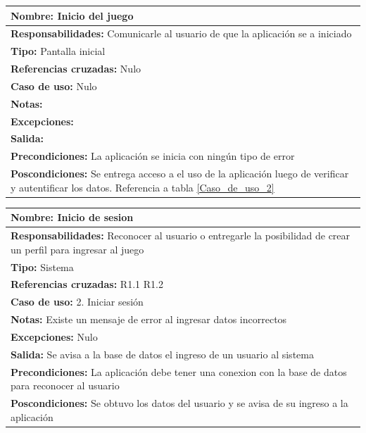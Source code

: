 \begin{table}[H]
    \begin{center}
        \begin{tabular}{| m{15cm} |}       
        	\hline 
        	\textbf{Nombre:} Inicio del juego \\
        	\hline
        	\textbf{Responsabilidades:} Comunicarle al usuario de que la aplicación se a iniciado\\
        	\hline
        	\textbf{Tipo:} Pantalla inicial \\
        	\hline
        	\textbf{Referencias cruzadas:} Nulo\\
        	\hline
        	\textbf{Caso de uso:} Nulo\\
        	\hline
        	\textbf{Notas:} \\
        	\hline
        	\textbf{Excepciones:} \\
        	\hline
        	\textbf{Salida:} \\
        	\hline
        	\textbf{Precondiciones:} La aplicación se inicia con ningún tipo de error\\
        	\hline
        	\textbf{Poscondiciones:} Se entrega acceso a el uso de la aplicación luego de verificar y autentificar los datos. Referencia a tabla \ref{Caso_de_uso_2}\\
        	\hline
        \end{tabular}
    \end{center}
\end{table}

\begin{table}[H]
    \begin{center}
        \begin{tabular}{|m{15cm} |}         
        	\hline 
        	\textbf{Nombre:} Inicio de sesion \\
        	\hline
        	\textbf{Responsabilidades:} Reconocer al usuario o entregarle la posibilidad de crear un perfil para ingresar al juego\\
        	\hline
        	\textbf{Tipo:} Sistema \\
        	\hline
        	\textbf{Referencias cruzadas:} R1.1 R1.2\\
        	\hline
        	\textbf{Caso de uso:} 2. Iniciar sesión\\
        	\hline
        	\textbf{Notas:} Existe un mensaje de error al ingresar datos incorrectos\\
        	\hline
        	\textbf{Excepciones:} Nulo\\
        	\hline
        	\textbf{Salida:} Se avisa a la base de datos el ingreso de un usuario al sistema\\
        	\hline
        	\textbf{Precondiciones:} La aplicación debe tener una conexion con la base de datos para reconocer al usuario \\
        	\hline
        	\textbf{Poscondiciones:} Se obtuvo los datos del usuario y se avisa de su ingreso a la aplicación\\
        	\hline
        \end{tabular}
    \end{center}
\end{table}

